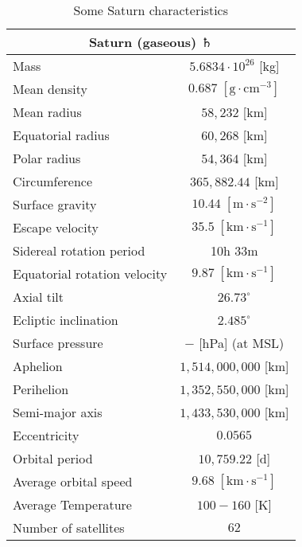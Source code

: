 	\begin{table}[H]
		\centering
		\begin{tabular}{|l|c|}
		\hline
		\multicolumn{2}{|c|}{\cellcolor[HTML]{9B9B9B}\textbf{Saturn (gaseous) $\saturn$}} \\ \hline
		Mass & $5.6834\cdot 10^{26}$ {[}kg{]} \\ \hline
		Mean density & $0.687\;[\text{g}\cdot \text{cm}^{-3}]$ \\ \hline
		Mean radius & $58,232$ {[}km{]} \\ \hline
		Equatorial radius & $60,268$ {[}km{]} \\ \hline
		Polar radius & $54,364$ {[}km{]} \\ \hline
		Circumference & $365,882.44$ {[}km{]} \\ \hline
		Surface gravity & $10.44\; [\text{m}\cdot \text{s}^{-2}]$ \\ \hline
		Escape velocity & $35.5 \;[\text{km}\cdot\text{s}^{-1}]$ \\ \hline
		Sidereal rotation period & 10h 33m \\ \hline
		Equatorial rotation velocity & $9.87\;[\text{km}\cdot\text{s}^{-1}]$ \\ \hline
		Axial tilt & $26.73^\circ$ \\ \hline
		Ecliptic inclination & $2.485^\circ$ \\ \hline
		Surface pressure & $-$ {[}hPa{]} (at MSL) \\ \hline
		Aphelion & $1,514,000,000$ {[}km{]} \\ \hline
		Perihelion & $1,352,550,000$ {[}km{]} \\ \hline
		Semi-major axis & $1,433,530,000$ {[}km{]} \\ \hline
		Eccentricity & $0.0565$ \\ \hline
		Orbital period & $10,759.22 $ {[}d{]} \\ \hline
		Average orbital speed & $9.68\;[\text{km}\cdot\text{s}^{-1}]$ \\ \hline
		Average Temperature & $100-160$ {[}K{]} \\ \hline
		Number of satellites & $62$ \\ \hline
		\end{tabular}
		\caption{Some Saturn characteristics}
	\end{table}
	
